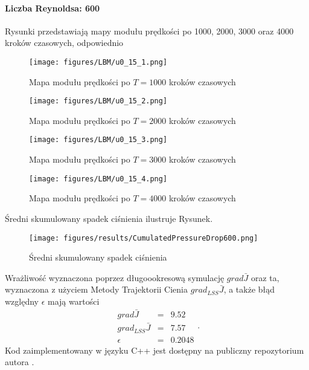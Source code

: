 \documentclass[12pt]{article}
\begin{document}
\paragraph{Liczba Reynoldsa: 600}
Rysunki przedstawiają mapy modułu prędkości po 1000, 2000, 3000 oraz 4000 kroków czasowych, odpowiednio 
\begin{figure}[H]
	\texttt{[image: figures/LBM/u0\_15\_1.png]} 
	\caption{Mapa modułu prędkości po $ T=1000 $ kroków czasowych}
\end{figure}
\begin{figure}[H]
	\texttt{[image: figures/LBM/u0\_15\_2.png]} 
	\caption{Mapa modułu prędkości po $ T=2000 $ kroków czasowych}
\end{figure}
\begin{figure}[H]
	\texttt{[image: figures/LBM/u0\_15\_3.png]} 
	\caption{Mapa modułu prędkości po $ T=3000 $ kroków czasowych}
\end{figure}
\begin{figure}[H]
	\texttt{[image: figures/LBM/u0\_15\_4.png]} 
	\caption{Mapa modułu prędkości po $ T=4000 $ kroków czasowych}
\end{figure}
Średni skumulowany spadek ciśnienia ilustruje Rysunek.
\begin{figure}[H]
	\texttt{[image: figures/results/CumulatedPressureDrop600.png]} 
	\centering
	\caption{Średni skumulowany spadek ciśnienia}
\end{figure}
Wrażliwość wyznaczona poprzez długoookresową symulację $ grad\bar{J} $ oraz ta, wyznaczona z użyciem Metody Trajektorii Cienia $ grad_{LSS}\bar{J} $, a także błąd względny $ \epsilon $ mają wartości
\begin{equation}
\begin{array}{rcl}
grad\bar{J} &=& 9.52 \\
grad_{LSS}\bar{J} &=& 7.57 \\ 
\epsilon &=& 0.2048
\end{array}.
\label{result600}
\end{equation}
Kod zaimplementowany w języku C++ jest dostępny na publiczny repozytorium autora \cite{Marek2}.
\end{document}
